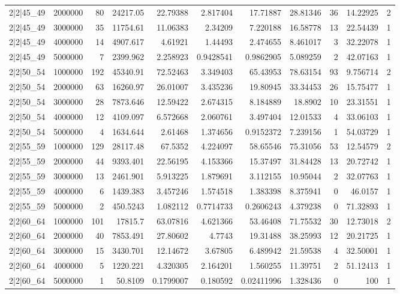 \begin{tabular}{lrrrrrrrrrr}
2|2|45\_49 & 2000000 & 80 & 24217.05 & 22.79388 & 2.817404 & 17.71887 & 28.81346 & 36 & 14.22925 & 2 \\
2|2|45\_49 & 3000000 & 35 & 11754.61 & 11.06383 & 2.34209 & 7.220188 & 16.58778 & 13 & 22.54439 & 1 \\
2|2|45\_49 & 4000000 & 14 & 4907.617 & 4.61921 & 1.44493 & 2.474655 & 8.461017 & 3 & 32.22078 & 1 \\
2|2|45\_49 & 5000000 & 7 & 2399.962 & 2.258923 & 0.9428541 & 0.9862905 & 5.089259 & 2 & 42.07163 & 1 \\
2|2|50\_54 & 1000000 & 192 & 45340.91 & 72.52463 & 3.349403 & 65.43953 & 78.63154 & 93 & 9.756714 & 2 \\
2|2|50\_54 & 2000000 & 63 & 16260.97 & 26.01007 & 3.435236 & 19.80945 & 33.34453 & 26 & 15.75477 & 1 \\
2|2|50\_54 & 3000000 & 28 & 7873.646 & 12.59422 & 2.674315 & 8.184889 & 18.8902 & 10 & 23.31551 & 1 \\
2|2|50\_54 & 4000000 & 12 & 4109.097 & 6.572668 & 2.060761 & 3.497404 & 12.01533 & 4 & 33.06103 & 1 \\
2|2|50\_54 & 5000000 & 4 & 1634.644 & 2.61468 & 1.374656 & 0.9152372 & 7.239156 & 1 & 54.03729 & 1 \\
2|2|55\_59 & 1000000 & 129 & 28117.48 & 67.5352 & 4.224097 & 58.65546 & 75.31056 & 53 & 12.54579 & 2 \\
2|2|55\_59 & 2000000 & 44 & 9393.401 & 22.56195 & 4.153366 & 15.37497 & 31.84428 & 13 & 20.72742 & 1 \\
2|2|55\_59 & 3000000 & 13 & 2461.901 & 5.913225 & 1.879691 & 3.112155 & 10.95044 & 2 & 32.07763 & 1 \\
2|2|55\_59 & 4000000 & 6 & 1439.383 & 3.457246 & 1.574518 & 1.383398 & 8.375941 & 0 & 46.0157 & 1 \\
2|2|55\_59 & 5000000 & 2 & 450.5243 & 1.082112 & 0.7714733 & 0.2606243 & 4.379238 & 0 & 71.32893 & 1 \\
2|2|60\_64 & 1000000 & 101 & 17815.7 & 63.07816 & 4.621366 & 53.46408 & 71.75532 & 30 & 12.73018 & 2 \\
2|2|60\_64 & 2000000 & 40 & 7853.491 & 27.80602 & 4.7743 & 19.31488 & 38.25993 & 12 & 20.21725 & 1 \\
2|2|60\_64 & 3000000 & 15 & 3430.701 & 12.14672 & 3.67805 & 6.489942 & 21.59538 & 4 & 32.50001 & 1 \\
2|2|60\_64 & 4000000 & 5 & 1220.221 & 4.320305 & 2.164201 & 1.560255 & 11.39751 & 2 & 51.12413 & 1 \\
2|2|60\_64 & 5000000 & 1 & 50.8109 & 0.1799007 & 0.180592 & 0.02411996 & 1.328436 & 0 & 100 & 1 \\

\end{tabular}
